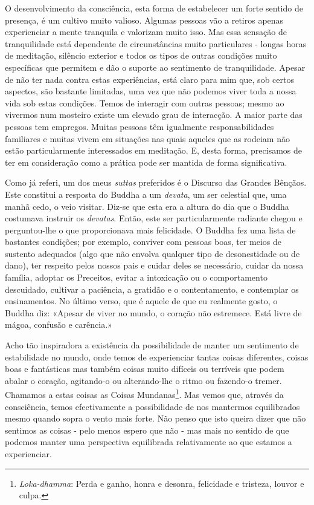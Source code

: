 O desenvolvimento da consciência, esta forma de estabelecer um forte
sentido de presença, é um cultivo muito valioso. Algumas pessoas vão a
retiros apenas experienciar a mente tranquila e valorizam muito isso.
Mas essa sensação de tranquilidade está dependente de circunstâncias
muito particulares - longas horas de meditação, silêncio exterior e
todos os tipos de outras condições muito específicas que permitem e dão
o suporte ao sentimento de tranquilidade. Apesar de não ter nada contra
estas experiências, está claro para mim que, sob certos aspectos, são
bastante limitadas, uma vez que não podemos viver toda a nossa vida sob
estas condições. Temos de interagir com outras pessoas; mesmo ao
vivermos num mosteiro existe um elevado grau de interacção. A maior
parte das pessoas tem empregos. Muitas pessoas têm igualmente
responsabilidades familiares e muitas vivem em situações nas quais
aqueles que as rodeiam não estão particularmente interessados em
meditação. E, desta forma, precisamos de ter em consideração como a
prática pode ser mantida de forma significativa.

Como já referi, um dos meus \emph{suttas} preferidos é o Discurso das
Grandes Bênçãos. Este constitui a resposta do Buddha a um \emph{devata},
um ser celestial que, uma manhã cedo, o veio visitar. Diz-se que esta
era a altura do dia que o Buddha costumava instruir os \emph{devatas}.
Então, este ser particularmente radiante chegou e perguntou-lhe o que
proporcionava mais felicidade. O Buddha fez uma lista de bastantes
condições; por exemplo, conviver com pessoas boas, ter meios de sustento
adequados (algo que não envolva qualquer tipo de desonestidade ou de
dano), ter respeito pelos nossos pais e cuidar deles se necessário,
cuidar da nossa família, adoptar os Preceitos, evitar a intoxicação ou o
comportamento descuidado, cultivar a paciência, a gratidão e o
contentamento, e contemplar os ensinamentos. No último verso, que é
aquele de que eu realmente gosto, o Buddha diz: «Apesar de viver no
mundo, o coração não estremece. Está livre de mágoa, confusão e
carência.»

Acho tão inspiradora a existência da possibilidade de manter um
sentimento de estabilidade no mundo, onde temos de experienciar tantas
coisas diferentes, coisas boas e fantásticas mas também coisas muito
difíceis ou terríveis que podem abalar o coração, agitando-o ou
alterando-lhe o ritmo ou fazendo-o tremer. Chamamos a estas coisas as
Coisas Mundanas\footnote{\emph{Loka-dhamma}: Perda e ganho, honra e
  desonra, felicidade e tristeza, louvor e culpa.}. Mas vemos que,
através da consciência, temos efectivamente a possibilidade de nos
mantermos equilibrados mesmo quando sopra o vento mais forte. Não penso
que isto queira dizer que não sentimos as coisas - pelo menos espero que
não - mas mais no sentido de que podemos manter uma perspectiva
equilibrada relativamente ao que estamos a experienciar.


